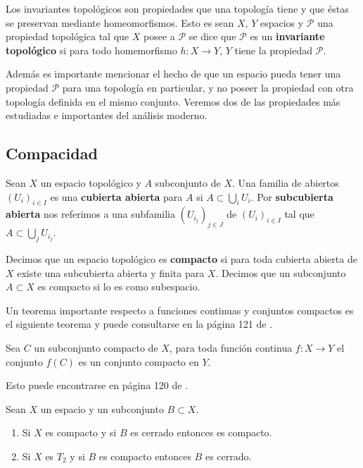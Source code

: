 Los invariantes topológicos son propiedades que una topología tiene y que éstas se preservan mediante homeomorfismos. Esto es sean $X$, $Y$ espacios y $\mathcal{P}$ una propiedad topológica tal que $X$ posee a $\mathcal{P}$ se dice que $\mathcal{P}$ es un \textbf{invariante topológico} si para todo homemorfismo $h:X \to Y$,  $Y$ tiene la propiedad $\mathcal{P}$.


Además es importante mencionar el hecho de que un espacio pueda tener una propiedad $\mathcal{P}$ para una topología en particular, y no poseer la propiedad con otra topología definida en el mismo conjunto. Veremos dos de las  propiedades más estudiadas e 
importantes del análisis moderno. 

\subsection*{Compacidad}

\begin{df}
Sean $X$ un espacio topológico y  $A$ subconjunto de $X$. Una familia de abiertos $(U_i)_{i \in I}$ es una \textbf{cubierta abierta} para $A$ si $A \subset \bigcup_i U_i.$ Por \textbf{subcubierta abierta} nos referimos a una subfamilia $(U_{i_j} )_{j \in J}$ de $(U_i)_{i \in I}$ tal que $ A \subset \bigcup_j U_{i_j}.$

Decimos que un espacio topológico es \textbf{compacto} si para toda cubierta abierta de $X$ existe una subcubierta abierta y finita para $X$. Decimos que un subconjunto $A \subset X$ es compacto si lo es como subespacio.
\end{df}

Un teorema importante respecto a funciones continuas y conjuntos compactos es el siguiente teorema y puede consultarse en la  página 121 de \cite{top_willd}.
 
\begin{te}
Sea $C$ un subconjunto compacto de $X$, para toda función continua $f:X \to Y$ el conjunto $f(C)$ es un conjunto compacto en $Y$.
\end{te}


Esto puede encontrarse en página 120 de \cite{top_willd}. 

\begin{te} 
Sean $X$ un espacio y un subconjunto $B \subset X$. 

	\begin{enumerate}
	\item Si $X$ es compacto y si $B$ es cerrado entonces es compacto. 
	\item Si $X$ es $T_2$ y si $B$ es compacto entonces $B$ es cerrado. 
	\end{enumerate}
	
\end{te}

